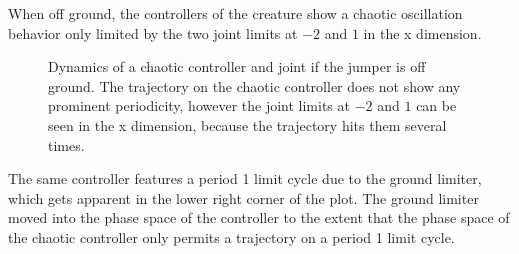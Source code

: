 \documentclass[main]{subfiles}
\begin{document}
When off ground, the controllers of the creature show a chaotic oscillation behavior only limited by the two joint limits at \(-2\) and \(1\) in the x dimension. %

\begin{figure}[H]
\centering
	\begin{minipage}{1.3\textwidth}
	\hspace*{-5em}
	\end{minipage}
\caption[Off ground controller dynamics of the crawler]{Dynamics of a chaotic controller and joint if the jumper is off ground. The trajectory on the chaotic controller does not show any prominent periodicity, however the joint limits at \(-2\) and \(1\) can be seen in the x dimension, because the trajectory hits them several times.}
\label{figure:crawler1-off-ground-controller-dynamics}
\end{figure}

The same controller features a period 1 limit cycle due to the ground limiter, which gets apparent in the lower right corner of the plot. %
%
The ground limiter moved into the phase space of the controller to the extent that the phase space of the chaotic controller only permits a trajectory on a period 1 limit cycle.%
\end{document}
